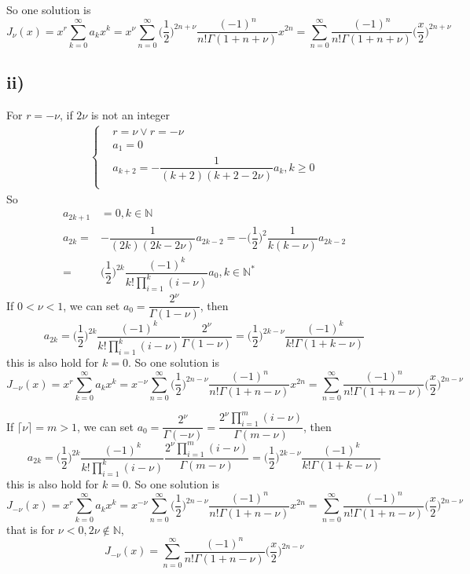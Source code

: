 \documentclass[a4paper,12pt,titlepage]{article}
\begin{document}
So one solution is
$$J_{\nu}(x)=x^{r}\sum\limits_{k=0}^{\infty}a_{k}x^k=x^{\nu}\sum\limits_{n=0}^{\infty}\Big(\dfrac{1}{2}\Big)^{2n+\nu}\dfrac{(-1)^n}{n!\Gamma(1+n+\nu)}x^{2n}=\sum\limits_{n=0}^{\infty}\dfrac{(-1)^n}{n!\Gamma(1+n+\nu)}\Big(\dfrac{x}{2}\Big)^{2n+\nu}$$

\subsection*{ii)}
For $r=-\nu$, if $2\nu$ is not an integer
\begin{align*}
\left\{
\begin{aligned}
&r=\nu\vee r=-\nu\\
&a_1=0\\
&a_{k+2}=-\dfrac{1}{(k+2)(k+2-2\nu)}a_k,k\geqslant0\\
\end{aligned}
\right.
\end{align*}
So
\begin{align*}
a_{2k+1}&=0,k\in\mathbb{N}\\
a_{2k}=&-\dfrac{1}{(2k)(2k-2\nu)}a_{2k-2}=-\Big(\dfrac{1}{2}\Big)^2\dfrac{1}{k(k-\nu)}a_{2k-2}\\
=&\Big(\dfrac{1}{2}\Big)^{2k}\dfrac{(-1)^k}{k!\prod\limits_{i=1}^k(i-\nu)}a_0,k\in\mathbb{N}^*
\end{align*}
If $0<\nu<1$, we can set $a_0=\dfrac{2^{\nu}}{\Gamma(1-\nu)}$, then $$a_{2k}=\Big(\dfrac{1}{2}\Big)^{2k}\dfrac{(-1)^k}{k!\prod\limits_{i=1}^k(i-\nu)}\dfrac{2^{\nu}}{\Gamma(1-\nu)}=\Big(\dfrac{1}{2}\Big)^{2k-\nu}\dfrac{(-1)^k}{k!\Gamma(1+k-\nu)}$$
this is also hold for $k=0$. So one solution is
$$J_{-\nu}(x)=x^{r}\sum\limits_{k=0}^{\infty}a_{k}x^k=x^{-\nu}\sum\limits_{n=0}^{\infty}\Big(\dfrac{1}{2}\Big)^{2n-\nu}\dfrac{(-1)^n}{n!\Gamma(1+n-\nu)}x^{2n}=\sum\limits_{n=0}^{\infty}\dfrac{(-1)^n}{n!\Gamma(1+n-\nu)}\Big(\dfrac{x}{2}\Big)^{2n-\nu}$$

If $\lceil\nu\rceil=m>1$,  we can set $a_0=\dfrac{2^{\nu}}{\Gamma(-\nu)}=\dfrac{2^{\nu}\prod\limits_{i=1}^{m}(i-\nu)}{\Gamma(m-\nu)}$, then $$a_{2k}=\Big(\dfrac{1}{2}\Big)^{2k}\dfrac{(-1)^k}{k!\prod\limits_{i=1}^k(i-\nu)}\dfrac{2^{\nu}\prod\limits_{i=1}^{m}(i-\nu)}{\Gamma(m-\nu)}=\Big(\dfrac{1}{2}\Big)^{2k-\nu}\dfrac{(-1)^k}{k!\Gamma(1+k-\nu)}$$
this is also hold for $k=0$. So one solution is
$$J_{-\nu}(x)=x^{r}\sum\limits_{k=0}^{\infty}a_{k}x^k=x^{-\nu}\sum\limits_{n=0}^{\infty}\Big(\dfrac{1}{2}\Big)^{2n-\nu}\dfrac{(-1)^n}{n!\Gamma(1+n-\nu)}x^{2n}=\sum\limits_{n=0}^{\infty}\dfrac{(-1)^n}{n!\Gamma(1+n-\nu)}\Big(\dfrac{x}{2}\Big)^{2n-\nu}$$
that is for $\nu<0,2\nu\notin\mathbb{N}$,
$$J_{-\nu}(x)=\sum\limits_{n=0}^{\infty}\dfrac{(-1)^n}{n!\Gamma(1+n-\nu)}\Big(\dfrac{x}{2}\Big)^{2n-\nu}$$
\end{document}
